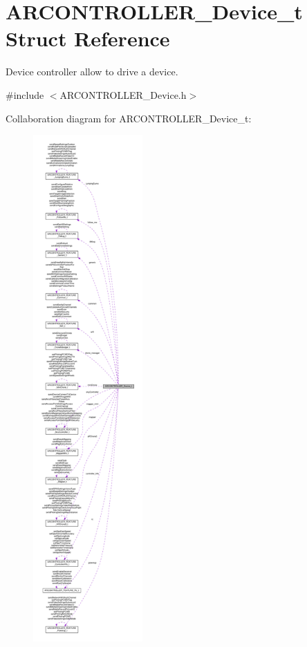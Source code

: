 \hypertarget{struct_a_r_c_o_n_t_r_o_l_l_e_r___device__t}{}\section{A\+R\+C\+O\+N\+T\+R\+O\+L\+L\+E\+R\+\_\+\+Device\+\_\+t Struct Reference}
\label{struct_a_r_c_o_n_t_r_o_l_l_e_r___device__t}


Device controller allow to drive a device.  




{\ttfamily \#include $<$A\+R\+C\+O\+N\+T\+R\+O\+L\+L\+E\+R\+\_\+\+Device.\+h$>$}



Collaboration diagram for A\+R\+C\+O\+N\+T\+R\+O\+L\+L\+E\+R\+\_\+\+Device\+\_\+t\+:
\nopagebreak
\begin{figure}[H]
\begin{center}
\leavevmode
\includegraphics[height=550pt]{struct_a_r_c_o_n_t_r_o_l_l_e_r___device__t__coll__graph}
\end{center}
\end{figure}
